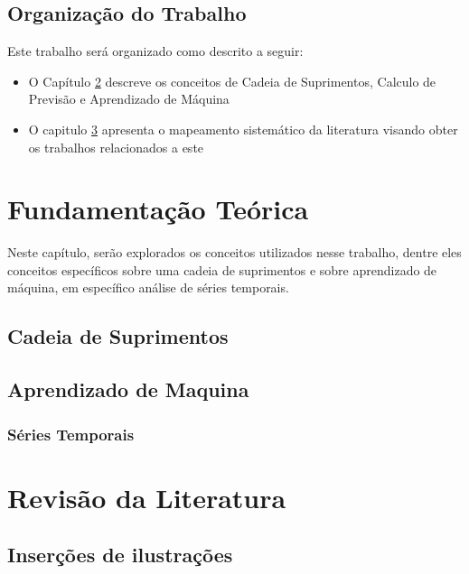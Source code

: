 \section{Organização do Trabalho}
Este trabalho será organizado como descrito a seguir:
\begin{itemize}
\item{O Capítulo \ref{theory} descreve os conceitos de Cadeia de Suprimentos, Calculo de Previsão e Aprendizado de Máquina}
\item{O capitulo \ref{revision} apresenta o mapeamento sistemático da literatura visando obter os trabalhos relacionados a este}
\end{itemize}

\chapter{Fundamentação Teórica}\label{theory}

Neste capítulo, serão explorados os conceitos utilizados nesse trabalho, dentre eles conceitos específicos sobre uma cadeia de suprimentos  e sobre aprendizado de máquina, em específico análise de séries temporais.

\section{Cadeia de Suprimentos}

\section{Aprendizado de Maquina}

\subsection{Séries Temporais}


\chapter{Revisão da Literatura} \label{revision}



\section{\esp Inserções de ilustrações}

